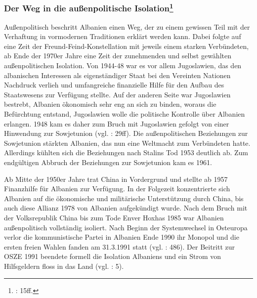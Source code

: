 \subsubsection[Der Weg in die außenpolitische Isolation]{Der Weg in die außenpolitische Isolation\footnote{\cite{vollmer07} : 15ff.}}

Außenpolitisch beschritt Albanien einen Weg, der zu einem gewissen Teil mit der Verhaftung in vormodernen Traditionen erklärt werden kann. Dabei folgte auf eine Zeit der Freund-Feind-Konstellation mit jeweils einem starken Verbündeten, ab Ende der 1970er Jahre eine Zeit der zunehmenden und selbst gewählten außenpolitischen Isolation. Von 1944-48 war es vor allem Jugoslawien, das den albanischen Interessen als eigenständiger Staat bei den Vereinten Nationen Nachdruck verlieh und umfangreiche finanzielle Hilfe für den Aufbau des Staatswesens zur Verfügung stellte. Auf der anderen Seite war Jugoslawien bestrebt, Albanien ökonomisch sehr eng an sich zu binden, woraus die Befürchtung entstand, Jugoslawien wolle die politische Kontrolle über Albanien erlangen. 1948 kam es daher zum Bruch mit Jugoslawien gefolgt von einer Hinwendung zur Sowjetunion (vgl. \cite{odonnell} : 29ff). Die außenpolitischen Beziehungen zur Sowjetunion stärkten Albanien, das nun eine Weltmacht zum Verbündeten hatte. Allerdings kühlten sich die Beziehungen nach Stalins Tod 1953 deutlich ab. Zum endgültigen Abbruch der Beziehungen zur Sowjetunion kam es 1961.\par
Ab Mitte der 1950er Jahre trat China in Vordergrund und stellte ab 1957 Finanzhilfe für Albanien zur Verfügung. In der Folgezeit konzentrierte sich Albanien auf die ökonomische und militärische Unterstützung durch China, bis auch diese Allianz 1978 von Albanien aufgekündigt wurde. Nach dem Bruch mit der Volksrepublik China bis zum Tode Enver Hoxhas 1985 war Albanien außenpolitisch vollständig isoliert. Nach Beginn der Systemwechsel in Osteuropa verlor die kommunistische Partei in Albanien Ende 1990 ihr Monopol und die ersten freien Wahlen fanden am 31.3.1991 statt (vgl. \cite{ammann} : 486). Der Beitritt zur OSZE 1991 beendete formell die Isolation Albaniens und ein Strom von Hilfsgeldern floss in das Land (vgl. \cite{deza} : 5).\par
